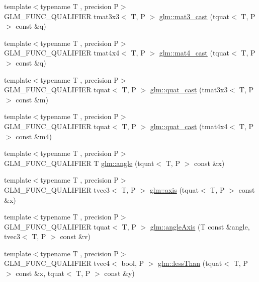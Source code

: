 \begin{DoxyCompactItemize}
\item 
{\footnotesize template$<$typename T , precision P$>$ }\\G\-L\-M\-\_\-\-F\-U\-N\-C\-\_\-\-Q\-U\-A\-L\-I\-F\-I\-E\-R tmat3x3$<$ T, P $>$ \hyperlink{group__gtc__quaternion_gae04c39422eb4e450ec8c4f45a1057b40}{glm\-::mat3\-\_\-cast} (tquat$<$ T, P $>$ const \&q)
\item 
{\footnotesize template$<$typename T , precision P$>$ }\\G\-L\-M\-\_\-\-F\-U\-N\-C\-\_\-\-Q\-U\-A\-L\-I\-F\-I\-E\-R tmat4x4$<$ T, P $>$ \hyperlink{group__gtc__quaternion_ga14bb2ddf028c91542763eb6f2bba47ef}{glm\-::mat4\-\_\-cast} (tquat$<$ T, P $>$ const \&q)
\item 
{\footnotesize template$<$typename T , precision P$>$ }\\G\-L\-M\-\_\-\-F\-U\-N\-C\-\_\-\-Q\-U\-A\-L\-I\-F\-I\-E\-R tquat$<$ T, P $>$ \hyperlink{group__gtc__quaternion_ga950f8acff3e33bbda77895a3dcb7e5ce}{glm\-::quat\-\_\-cast} (tmat3x3$<$ T, P $>$ const \&m)
\item 
{\footnotesize template$<$typename T , precision P$>$ }\\G\-L\-M\-\_\-\-F\-U\-N\-C\-\_\-\-Q\-U\-A\-L\-I\-F\-I\-E\-R tquat$<$ T, P $>$ \hyperlink{group__gtc__quaternion_ga3e4615e9884dd0f41f5617b9848a5d9c}{glm\-::quat\-\_\-cast} (tmat4x4$<$ T, P $>$ const \&m4)
\item 
{\footnotesize template$<$typename T , precision P$>$ }\\G\-L\-M\-\_\-\-F\-U\-N\-C\-\_\-\-Q\-U\-A\-L\-I\-F\-I\-E\-R T \hyperlink{group__gtc__quaternion_gad4a4448baedb198b2b1e7880d2544dc9}{glm\-::angle} (tquat$<$ T, P $>$ const \&x)
\item 
{\footnotesize template$<$typename T , precision P$>$ }\\G\-L\-M\-\_\-\-F\-U\-N\-C\-\_\-\-Q\-U\-A\-L\-I\-F\-I\-E\-R tvec3$<$ T, P $>$ \hyperlink{group__gtc__quaternion_ga0b3e87a13b2708154b72259e50789a19}{glm\-::axis} (tquat$<$ T, P $>$ const \&x)
\item 
{\footnotesize template$<$typename T , precision P$>$ }\\G\-L\-M\-\_\-\-F\-U\-N\-C\-\_\-\-Q\-U\-A\-L\-I\-F\-I\-E\-R tquat$<$ T, P $>$ \hyperlink{group__gtc__quaternion_ga37ae19405f1ccf766f27e4fcd035d859}{glm\-::angle\-Axis} (T const \&angle, tvec3$<$ T, P $>$ const \&v)
\item 
{\footnotesize template$<$typename T , precision P$>$ }\\G\-L\-M\-\_\-\-F\-U\-N\-C\-\_\-\-Q\-U\-A\-L\-I\-F\-I\-E\-R tvec4$<$ bool, P $>$ \hyperlink{group__gtc__quaternion_ga91a40d16a3b5bb47d71ac1a3fb688ffa}{glm\-::less\-Than} (tquat$<$ T, P $>$ const \&x, tquat$<$ T, P $>$ const \&y)

\end{DoxyCompactItemize}
